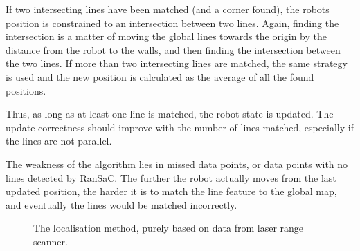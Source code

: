 If two intersecting lines have been matched (and a corner found), the robots position is constrained to
an intersection between two lines. Again, finding the intersection is a matter of moving the global
lines towards the origin by the distance from the robot to the walls,
and then finding the intersection between the two lines.
If more than two intersecting lines are matched, the same strategy is used and the new position
is calculated as the average of all the found positions.

Thus, as long as at least one line is matched, the robot state is updated.
The update correctness should improve with the number of lines matched,
especially if the lines are not parallel.

The weakness of the algorithm lies in missed data points, or data points with no lines detected by RanSaC.
The further the robot actually moves from the last updated position, the harder it is to match the line
feature to the global map, and eventually the lines would be matched incorrectly.

\begin{figure}
  
  \caption{The localisation method, purely based on data from laser range scanner.}
  \label{fig:localisation}
\end{figure}

